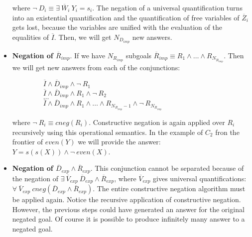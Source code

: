 \documentclass{tlp}
\begin{document}
\begin{itemize}
           where $ \neg~ D_i \equiv \exists~
           \overline{W}_i~ Y_i = s_i$. The negation of a universal
           quantification turns into an existential quantification and
           the quantification of free variables of $\overline{Z}_i$
           gets lost, because the variables are unified with the evaluation of
           the equalities of $\overline{I}$. Then, we will get
           $N_{D_{imp}}$ new answers.


           \item {\bf Negation of $\overline{R}_{imp}$}. If we have
           $N_{R_{imp}}$ subgoals $\overline{R}_{imp} \equiv R_1
           \wedge \ldots \wedge R_{N_{R_{imp}}}$. Then we will get
           new answers from each of the conjunctions: 

           $~~~~~~~~~~~~~~~~~~~~\overline{I} \wedge \overline{D}_{imp} \wedge \neg~ R_1 $ \\ 
           $~~~~~~~~~~~~~~~~~~~~\overline{I} \wedge \overline{D}_{imp} \wedge
           R_1 \wedge \neg~ R_2 $ \\ 
           $~~~~~~~~~~~~~~~~~~~~\ldots $ \\ 
           $~~~~~~~~~~~~~~~~~~~~\overline{I} \wedge \overline{D}_{imp} \wedge
           R_1 \wedge \ldots \wedge R_{N_{R_{imp}}-1} \wedge \neg~
           R_{N_{R_{imp}}}$ 

           where $ \neg~ R_i \equiv cneg(R_i)$. Constructive negation is again
           applied over $R_i$ recursively using this operational semantics.
           In the example of $C_2$ fron the frontier of $even(Y)$ we will
           provide the answer: $Y = s(s(X)) \wedge \neg~even(X)$.

           \item {\bf Negation of $\overline{D}_{exp} \wedge
           \overline{R}_{exp}$}. This conjunction cannot be separated
           because of the negation of $ \exists~ \overline{V}_{exp}~
           \overline{D}_{exp} \wedge \overline{R}_{exp}$, where
           $\overline{V}_{exp}$ gives universal quantifications:\\
           $\forall~ \overline{V}_{exp}~ cneg(\overline{D}_{exp}
           \wedge \overline{R}_{exp})$. The entire constructive
           negation algorithm must be applied again. Notice the
           recursive application of constructive negation. However,
           the previous steps could have generated an answer for the
           original negated goal. Of course it is possible to produce
           infinitely many answer to a negated goal.


\end{itemize}
\end{document}
